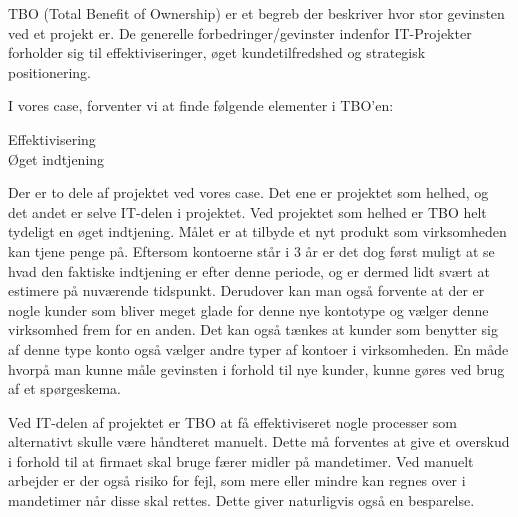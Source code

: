 TBO (Total Benefit of Ownership) er et begreb der beskriver hvor stor gevinsten
ved et projekt er. De generelle forbedringer/gevinster indenfor IT-Projekter
forholder sig til effektiviseringer, øget kundetilfredshed og strategisk
positionering.

I vores case, forventer vi at finde følgende elementer i TBO'en:

\begin{description}
\item[Effektivisering]
\item[Øget indtjening]
\end{description}

Der er to dele af projektet ved vores case. Det ene er projektet som helhed, og
det andet er selve IT-delen i projektet. Ved projektet som helhed er TBO helt
tydeligt en øget indtjening. Målet er at tilbyde et nyt produkt som virksomheden
kan tjene penge på. Eftersom kontoerne står i 3 år er det dog først muligt at
se hvad den faktiske indtjening er efter denne periode, og er dermed lidt svært
at estimere på nuværende tidspunkt. Derudover kan man også forvente at der er
nogle kunder som bliver meget glade for denne nye kontotype og vælger denne
virksomhed frem for en anden. Det kan også tænkes at kunder som benytter sig af
denne type konto også vælger andre typer af kontoer i virksomheden. En måde
hvorpå man kunne måle gevinsten i forhold til nye kunder, kunne gøres ved brug
af et spørgeskema.

Ved IT-delen af projektet er TBO at få effektiviseret nogle processer som
alternativt skulle være håndteret manuelt. Dette må forventes at give et
overskud i forhold til at firmaet skal bruge færer midler på mandetimer. Ved
manuelt arbejder er der også risiko for fejl, som mere eller mindre kan regnes
over i mandetimer når disse skal rettes. Dette giver naturligvis også en
besparelse.
